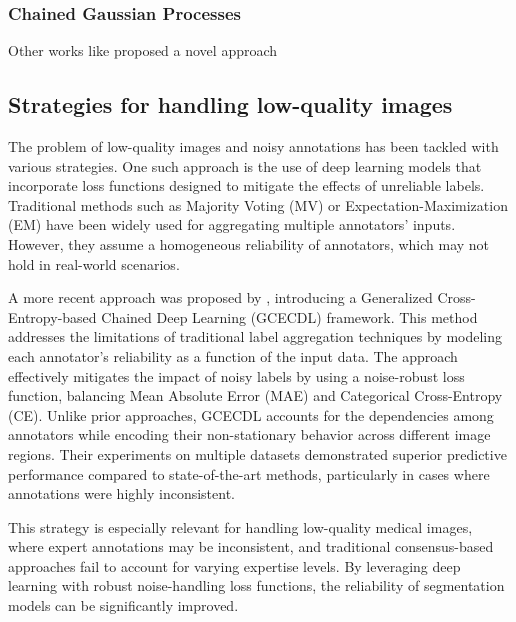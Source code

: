 \subsubsection{Chained Gaussian Processes}

Other works like \cite{GilGonzalesEtAl2025} proposed a novel approach

\subsection{Strategies for handling low-quality images}

The problem of low-quality images and noisy annotations has been
tackled with various strategies. One such approach is the use of deep
learning models that incorporate loss functions designed to mitigate
the effects of unreliable labels. Traditional methods such as
Majority Voting (MV) or Expectation-Maximization (EM) have been
widely used for aggregating multiple annotators' inputs. However,
they assume a homogeneous reliability of annotators, which may not
hold in real-world scenarios.

A more recent approach was proposed by \cite{TrianaEtAl2023},
introducing a Generalized Cross-Entropy-based Chained Deep Learning
(GCECDL) framework. This method addresses the limitations of
traditional label aggregation techniques by modeling each annotator's
reliability as a function of the input data. The approach effectively
mitigates the impact of noisy labels by using a noise-robust loss
function, balancing Mean Absolute Error (MAE) and Categorical
Cross-Entropy (CE). Unlike prior approaches, GCECDL accounts for the
dependencies among annotators while encoding their non-stationary
behavior across different image regions. Their experiments on
multiple datasets demonstrated superior predictive performance
compared to state-of-the-art methods, particularly in cases where
annotations were highly inconsistent.

This strategy is especially relevant for handling low-quality medical
images, where expert annotations may be inconsistent, and traditional
consensus-based approaches fail to account for varying expertise
levels. By leveraging deep learning with robust noise-handling loss
functions, the reliability of segmentation models can be significantly improved.

